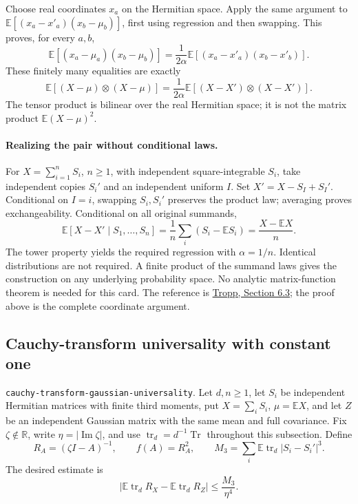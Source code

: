 \documentclass[11pt,a4paper]{article}
\newcommand{\R}{\mathbb R}
\DeclareMathOperator{\tr}{tr}
\DeclareRobustCommand{\code}[1]{{\footnotesize\urlstyle{tt}\nolinkurl{#1}}}
\begin{document}
Choose real coordinates $x_a$ on the Hermitian space.  Apply the same
argument to $\mathbb E[(x_a-x'_a)(x_b-\mu_b)]$, first using regression
and then swapping.  This proves, for every $a,b$,
\[
 \mathbb E[(x_a-\mu_a)(x_b-\mu_b)]
   =\frac1{2\alpha}\mathbb E[(x_a-x'_a)(x_b-x'_b)].
\]
These finitely many equalities are exactly
\[
 \mathbb E[(X-\mu)\otimes(X-\mu)]
   =\frac1{2\alpha}\mathbb E[(X-X')\otimes(X-X')].
\]
The tensor product is bilinear over the real Hermitian space; it is not
the matrix product $\mathbb E(X-\mu)^2$.

\paragraph{Realizing the pair without conditional laws.}
For $X=\sum_{i=1}^nS_i$, $n\ge1$, with independent square-integrable
$S_i$, take independent copies $S_i'$ and an independent uniform $I$.
Set $X'=X-S_I+S_I'$.  Conditional on $I=i$, swapping $S_i,S_i'$ preserves
the product law; averaging proves exchangeability.  Conditional on all
original summands,
\[
 \mathbb E[X-X'\mid S_1,\ldots,S_n]
   =\frac1n\sum_i(S_i-\mathbb ES_i)=\frac{X-\mathbb EX}{n}.
\]
The tower property yields the required regression with $\alpha=1/n$.
Identical distributions are not required.  A finite product of the
summand laws gives the construction on any underlying probability space.
No analytic matrix-function theorem is needed for this card.
The reference is \href{https://arxiv.org/html/2603.05803v2#S6.SS3}{Tropp,
Section 6.3}; the proof above is the complete coordinate argument.

\subsection{Cauchy-transform universality with constant one}
\label{route:cauchy-transform-gaussian-universality}
\code{cauchy-transform-gaussian-universality}.
Let $d,n\ge1$, let $S_i$ be independent Hermitian matrices with finite
third moments, put $X=\sum_iS_i$, $\mu=\mathbb EX$, and let $Z$ be an
independent Gaussian matrix with the same mean and full covariance.
Fix $\zeta\notin\R$, write $\eta=|\operatorname{Im}\zeta|$, and use
$\tr_d=d^{-1}\operatorname{Tr}$ throughout this subsection.  Define
\[
 R_A=(\zeta I-A)^{-1},\qquad f(A)=R_A^2,\qquad
 M_3=\sum_i\mathbb E\tr_d|S_i-S_i'|^3.
\]
The desired estimate is
\begin{equation}\label{eq:comparison-cauchy-target}
 \left|\mathbb E\tr_d R_X-\mathbb E\tr_d R_Z\right|
 \le\frac{M_3}{\eta^4}.
\end{equation}
\end{document}
